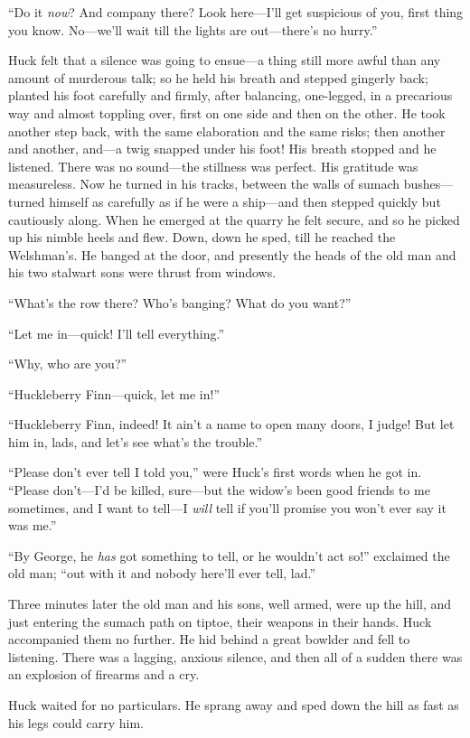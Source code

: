 \documentclass{book}
\begin{document}
“Do it \emph{now}? And company there? Look here—I’ll get suspicious of you, first thing you know. No—we’ll wait till the lights are out—there’s no hurry.”

Huck felt that a silence was going to ensue—a thing still more awful than any amount of murderous talk; so he held his breath and stepped gingerly back; planted his foot carefully and firmly, after balancing, one-legged, in a precarious way and almost toppling over, first on one side and then on the other. He took another step back, with the same elaboration and the same risks; then another and another, and—a twig snapped under his foot! His breath stopped and he listened. There was no sound—the stillness was perfect. His gratitude was measureless. Now he turned in his tracks, between the walls of sumach bushes—turned himself as carefully as if he were a ship—and then stepped quickly but cautiously along. When he emerged at the quarry he felt secure, and so he picked up his nimble heels and flew. Down, down he sped, till he reached the Welshman’s. He banged at the door, and presently the heads of the old man and his two stalwart sons were thrust from windows.

“What’s the row there? Who’s banging? What do you want?”

“Let me in—quick! I’ll tell everything.”

“Why, who are you?”

“Huckleberry Finn—quick, let me in!”

“Huckleberry Finn, indeed! It ain’t a name to open many doors, I judge! But let him in, lads, and let’s see what’s the trouble.”

“Please don’t ever tell I told you,” were Huck’s first words when he got in. “Please don’t—I’d be killed, sure—but the widow’s been good friends to me sometimes, and I want to tell—I \emph{will} tell if you’ll promise you won’t ever say it was me.”

“By George, he \emph{has} got something to tell, or he wouldn’t act so!” exclaimed the old man; “out with it and nobody here’ll ever tell, lad.”

Three minutes later the old man and his sons, well armed, were up the hill, and just entering the sumach path on tiptoe, their weapons in their hands. Huck accompanied them no further. He hid behind a great bowlder and fell to listening. There was a lagging, anxious silence, and then all of a sudden there was an explosion of firearms and a cry.

Huck waited for no particulars. He sprang away and sped down the hill as fast as his legs could carry him.
\end{document}
